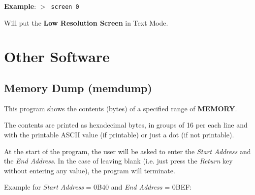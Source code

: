 \documentclass[a4paper,11pt]{article}
\begin{document}
        \textbf{Example}: \texttt{$>$ screen 0}

        Will put the \textbf{Low Resolution Screen} in Text Mode.

    \pagebreak
    \section{Other Software}

    \subsection{Memory Dump (memdump)}
    This program shows the contents (bytes) of a specified range of
    \textbf{MEMORY}.

    The contents are printed as hexadecimal bytes, in groups of 16 per each line
    and with the printable ASCII value (if printable) or just a dot (if not
    printable).

    At the start of the program, the user will be asked to enter the
    \textit{Start Address} and the \textit{End Address}. In the case of leaving
    blank (i.e. just press the \textit{Return} key without entering any value),
    the program will terminate.

    Example for \textit{Start Address} = 0B40 and \textit{End Address} = 0BEF:
\end{document}
